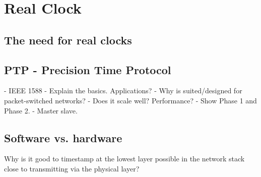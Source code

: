 \section{Real Clock}\label{sc:realClock}

\subsection{The need for real clocks}

\subsection{PTP - Precision Time Protocol}

- IEEE 1588
- Explain the basics. Applications?
- Why is suited/designed for packet-switched networks?
- Does it scale well? Performance?
- Show Phase 1 and Phase 2.
- Master slave.

\subsection{Software vs. hardware}

Why is it good to timestamp at the lowest layer possible in the network stack close to transmitting via the physical layer?